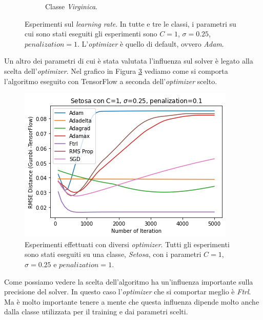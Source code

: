 \documentclass[a4paper,12pt]{report}
\begin{document}
\begin{figure}[H]
\begin{subfigure}{\textwidth}
        \caption{Classe \textit{Virginica}.}
        \label{subfig:Virginica_learning_rate}
    \end{subfigure}
    \caption{Esperimenti sul \textit{learning rate}. In tutte e tre le classi, i parametri su cui sono stati eseguiti gli esperimenti sono $C=1$, $\sigma=0.25$, $\textit{penalization}=1$. L'\textit{optimizer} è quello di default, ovvero \textit{Adam}.}
    \label{fig:esperimenti_learning_rate}
\end{figure}


\noindent Un altro dei parametri di cui è stata valutata l'influenza sul solver è legato alla scelta dell'\textit{optimizer}. Nel grafico in Figura \ref{fig:different_optimizer} vediamo come si comporta l'algoritmo eseguito con TensorFlow a seconda dell'\textit{optimizer} scelto.

\begin{figure}[H]
    \centering
    \includegraphics[scale=0.8]{images/Grafici/Different_Optimizer.png}
    \caption{Esperimenti effettuati con diversi \textit{optimizer}. Tutti gli esperimenti sono stati eseguiti su una classe, \textit{Setosa}, con i parametri $C=1$, $\sigma=0.25$ e $\textit{penalization}=1$.}
    \label{fig:different_optimizer}
\end{figure}


\noindent Come possiamo vedere la scelta dell'algoritmo ha un'influenza importante sulla precisione del solver. In questo caso l'\textit{optimizer} che si comportar meglio è \textit{Ftrl}. Ma è molto importante tenere a mente che questa influenza dipende molto anche dalla classe utilizzata per il training e dai parametri scelti.
\end{document}
